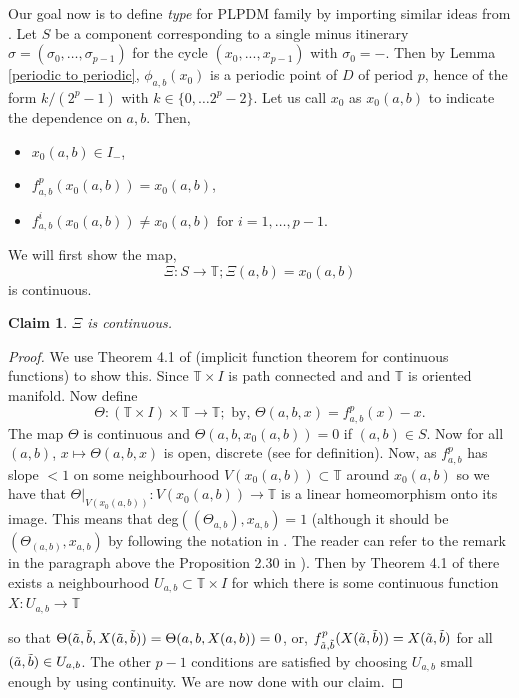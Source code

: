 \documentclass[12pt]{amsart}
\numberwithin{equation}{section}
\newtheorem{claim}[theorem]{Claim}
\theoremstyle{remark}
\begin{document}
Our goal now is to  define \textit{type} for PLPDM family by importing similar ideas from \cite{MR}.  Let $S$ be a component  corresponding to a single minus itinerary $\sigma=(\sigma_0,\ldots,\sigma_{p-1})$ for the cycle $(x_0,...,x_{p-1})$ with $\sigma_0=-$. Then by Lemma \ref{periodic to periodic}, $\phi_{a,b}(x_0)$ is a periodic point of $D$ of period $p$, hence of the form $k/(2^p-1)$ with $ k \in \{0,\ldots 2^p-2\}$. Let us call $x_0$ as $x_0(a,b)$ to indicate the dependence on $a,b$. Then, 
    \begin{itemize}
        \item $x_0(a,b) \in I_-$,
        \item $f_{a,b}^p(x_0(a,b))=x_0(a,b)$,
        \item $f_{a,b}^i(x_0(a,b)) \neq x_0(a,b)\text{ for }  i=1,\ldots,p-1$.
    \end{itemize}
   
We will first show the map, \[
\Xi: S \to \mathbb{T} ; \Xi(a,b)= x_0(a,b)
\]
is continuous. 
\begin{claim}\label{imlicit}
    $\Xi$ is continuous.
\end{claim}
    \begin{proof}
        We use Theorem 4.1 of \cite{BGD} (implicit function theorem for continuous functions) to show this. Since $\mathbb{T} \times I$ is path connected and and $\mathbb{T}$ is oriented manifold. Now define 
        \[
        \Theta : (\mathbb{T} \times I) \times \mathbb{T} \to \mathbb{T}; \text{ by, }
        \Theta(a,b,x)=f_{a,b}^p(x)-x.
        \]
        The map $\Theta$ is continuous and $\Theta(a,b,x_0(a,b))=0$ if  $(a,b) \in S $.
        Now for all $(a,b)$,  $x \mapsto \Theta(a,b,x)$ is open, discrete (see \cite{BGD} for definition). Now, as $f_{a,b}^p$ has slope $<1$ on some neighbourhood $V(x_0(a,b)) \subset \mathbb{T}$ around $x_0(a,b)$ so we have that $\Theta|_{V(x_0(a,b))}: V(x_0(a,b)) \to \mathbb{T}$ is a linear homeomorphism onto its image. This means that deg$((\Theta_{a,b}), x_{a,b})=1$ (although it should be $(\Theta_{(a,b)}, x_{a,b})$ by following the notation in \cite{BGD}. The reader can refer to the remark in the paragraph above the Proposition 2.30 in \cite{AlH}). Then by Theorem 4.1 of \cite{BGD} there exists a neighbourhood $U_{a,b} \subset \mathbb{T} \times I$ for which there is some continuous function $X: U_{a,b} \to \mathbb{T}$
        \vspace{.1cm}
        
        \noindent so that $\Theta(\Tilde{a},\Tilde{b},X(\Tilde{a},\Tilde{b}))=\Theta(a,b,X(a,b))=0$, or, $f^p_{\Tilde{a},\Tilde{b}}(X(\Tilde{a},\Tilde{b}))=X(\Tilde{a},\Tilde{b})$ for all $(\Tilde{a},\Tilde{b}) \in U_{a,b}$. The other $p-1$ conditions are satisfied by choosing $U_{a,b}$ small enough by using continuity. We are now done with our claim.
\end{proof}
\end{document}
